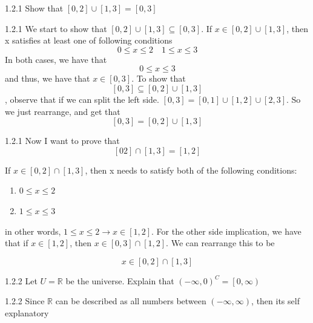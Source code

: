 \documentclass[a4paper,norsk]{article}
\renewcommand{\leq}{\leqslant}
\begin{document}
\begin{oppgavebox}{1.2.1}{}
  Show that $ \left[ 0, 2 \right] \cup \left[ 1, 3 \right] = \left[ 0, 3 \right]    $ 

  \begin{proofbox}{1.2.1}{}
    We start to show that $ \left[ 0, 2 \right]  \cup \left[ 1, 3 \right]  \subseteq \left[ 0, 3 \right]  $. If $ x \in \left[ 0, 2 \right] \cup \left[ 1, 3 \right]   $, then x satisfies at least one of following conditions
    \[
        0 \leq x \leq 2 \quad  1 \leq x \leq 3
    \]
    In both cases, we have that 
    \[
        0 \leq x \leq 3
    \]
    and thus,  we have that $ x \in \left[ 0, 3 \right]  $. To show that 
    \[
        \left[ 0, 3 \right] \subseteq \left[ 0, 2 \right] \cup \left[ 1, 3 \right]  
    \]
    , observe that if we can split the left side. $ \left[ 0, 3 \right] = \left[ 0, 1 \right] \cup \left[ 1, 2 \right] \cup \left[ 2, 3 \right]     $. So we just rearrange, and get that 
    \[
        \left[ 0, 3 \right] = \left[ 0, 2 \right] \cup \left[ 1, 3 \right]  
    \]    
  \end{proofbox}

  \begin{proofbox}{1.2.1}{}
    Now I want to prove that 
    \[
        \left[ 0 2 \right] \cap \left[ 1, 3 \right] = \left[ 1, 2 \right] 
    \]
    
    If $ x \in \left[ 0, 2 \right] \cap \left[ 1, 3 \right]   $, then x needs to satisfy both of the following conditions:
    \begin{enumerate}
      \item $ 0 \leq x \leq 2 $ 
      \item $ 1 \leq x \leq 3 $ 
    \end{enumerate} 
    in other words, $ 1 \leq x \leq 2 \rightarrow x \in \left[ 1, 2 \right]  $. For the other side implication, we have that if $ x \in \left[ 1, 2 \right]  $, then $ x \in \left[ 0,  3 \right] \cap \left[ 1, 2 \right] $. We can rearrange this to be 
    
    \[
        x \in \left[ 0, 2 \right] \cap \left[ 1, 3 \right]  
    \]
    
  \end{proofbox}
\end{oppgavebox}


\begin{oppgavebox}{1.2.2}{}
Let $ U = \mathbb{R} $ be the universe. Explain that $ \left( - \infty, 0 \right)^C = \left[ 0, \infty \right)   $ 
  \begin{proofbox}{1.2.2}{}
    Since $ \mathbb{R} $ can be described as all numbers between $ \left( - \infty, \infty \right)  $,  then its self explanatory
  \end{proofbox}
\end{oppgavebox}
\end{document}
